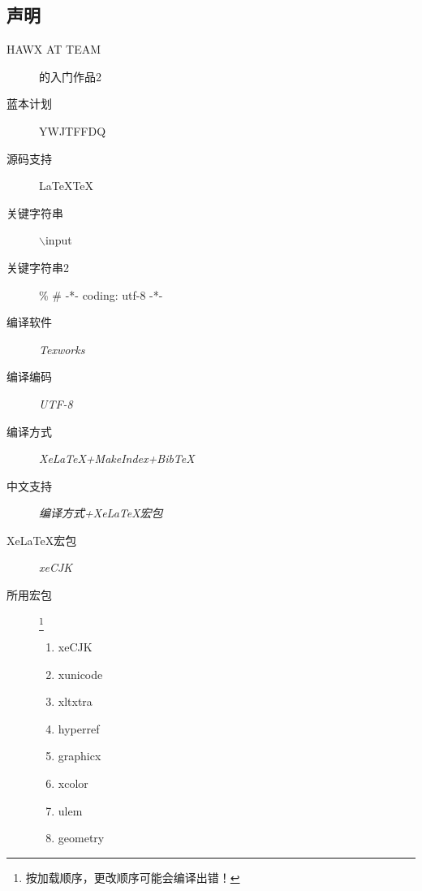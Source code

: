 \subsection{声明}
\begin{description}
\item[HAWX AT TEAM]的入门作品2
\item[蓝本计划]YWJTFFDQ
\item[源码支持]\XeTeX \LaTeXe  \LaTeX  \TeX
\item[关键字符串]$\backslash$input
\item[关键字符串2]\% \# -*- coding: utf-8 -*-
\item[编译软件]\emph{Texworks}
\item[编译编码]\emph{UTF-8}
\item[编译方式]\emph{XeLaTeX+MakeIndex+BibTeX}
\item[中文支持]\emph{编译方式+XeLaTeX宏包}
\item[XeLaTeX宏包]\emph{xeCJK}
\item[所用宏包]\footnote{按加载顺序，更改顺序可能会编译出错！}
\begin{enumerate}
\item xeCJK
\item xunicode
\item xltxtra
\item hyperref
\item graphicx
\item xcolor
\item ulem
\item geometry
\end{enumerate}
\end{description}
